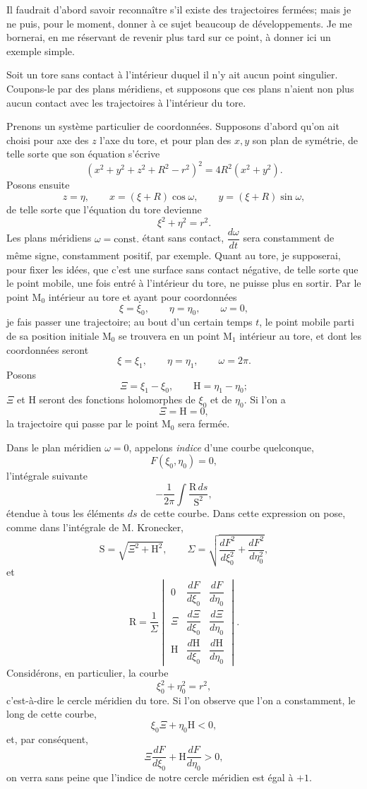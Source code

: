 \documentclass[11pt]{article}
\begin{document}
Il faudrait d’abord savoir reconnaître s’il existe des trajectoires fermées; mais je ne puis, pour le moment, donner à ce sujet beaucoup de développements. Je me bornerai, en me réservant de revenir plus tard sur ce point, à donner ici un exemple simple.

Soit un tore sans contact à l’intérieur duquel il n’y ait aucun point singulier. Coupons-le par des plans méridiens, et supposons que ces plans n’aient non plus aucun contact avec les trajectoires à l’intérieur du tore.

Prenons un système particulier de coordonnées. Supposons d’abord qu’on ait choisi pour axe des $z$ l’axe du tore, et pour plan des $x,y$ son plan de symétrie, de telle sorte que son équation s’écrive
\[
\left(x^2+y^2+z^2+R^2-r^2\right)^2=4R^2(x^2+y^2).
\]
Posons ensuite
\[
z=\eta,
\qquad x=(\xi+R)\cos\omega,
\qquad y=(\xi+R)\sin\omega,
\]
de telle sorte que l’équation du tore devienne
\[
\xi^2+\eta^2=r^2.
\]
Les plans méridiens $\omega=\mathrm{const.}$ étant sans contact, $\dfrac{d\omega}{dt}$ sera constamment de même signe, constamment positif, par exemple. Quant au tore, je supposerai, pour fixer les idées, que c’est une surface sans contact négative, de telle sorte que le point mobile, une fois entré à l’intérieur du tore, ne puisse plus en sortir. Par le point $\mathrm{M}_0$ intérieur au tore et ayant pour coordonnées
\[
\xi=\xi_0,
\qquad \eta=\eta_0,
\qquad \omega=0,
\]
je fais passer une trajectoire; au bout d’un certain temps $t$, le point mobile parti de sa position initiale $\mathrm{M}_0$ se trouvera en un point $\mathrm{M}_1$ intérieur au tore, et dont les coordonnées seront
\[
\xi=\xi_1,
\qquad \eta=\eta_1,
\qquad \omega=2\pi.
\]
Posons
\[
\Xi=\xi_1-\xi_0,
\qquad \mathrm{H}=\eta_1-\eta_0;
\]
$\Xi$ et $\mathrm{H}$ seront des fonctions holomorphes de $\xi_0$ et de $\eta_0$. Si l’on a
\[
\Xi=\mathrm{H}=0,
\]
la trajectoire qui passe par le point $\mathrm{M}_0$ sera fermée.

Dans le plan méridien $\omega=0$, appelons \emph{indice} d’une courbe quelconque,
\[
F(\xi_0,\eta_0)=0,
\]
l’intégrale suivante
\[
-\frac1{2\pi}\int \frac{\mathrm{R}\,ds}{\mathrm{S}^2},
\]
étendue à tous les éléments $ds$ de cette courbe. Dans cette expression on pose, comme dans l’intégrale de M. Kronecker,
\[
\mathrm{S}=\sqrt{\Xi^2+\mathrm{H}^2},
\qquad
\Sigma=\sqrt{\frac{dF^2}{d\xi_0^2}+\frac{dF^2}{d\eta_0^2}},
\]
et
\[
\mathrm{R}=\frac1{\Sigma}
\begin{vmatrix}
0&\dfrac{dF}{d\xi_0}&\dfrac{dF}{d\eta_0}\\[0.6em]
\Xi&\dfrac{d\Xi}{d\xi_0}&\dfrac{d\Xi}{d\eta_0}\\[0.6em]
\mathrm{H}&\dfrac{d\mathrm{H}}{d\xi_0}&\dfrac{d\mathrm{H}}{d\eta_0}
\end{vmatrix}.
\]
Considérons, en particulier, la courbe
\[
\xi_0^2+\eta_0^2=r^2,
\]
c’est-à-dire le cercle méridien du tore. Si l’on observe que l’on a constamment, le long de cette courbe,
\[
\xi_0\Xi+\eta_0\mathrm{H}<0,
\]
et, par conséquent,
\[
\Xi\frac{dF}{d\xi_0}+\mathrm{H}\frac{dF}{d\eta_0}>0,
\]
on verra sans peine que l’indice de notre cercle méridien est égal à $+1$.
\end{document}
